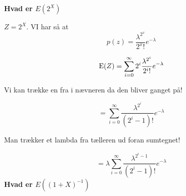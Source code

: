 \textbf{Hvad er $E \left( 2^X \right)$}

$Z = 2^X$. VI har så at
\begin{equation}
    p(z) = \frac{\lambda^{2^x}}{2^x!}e^{-\lambda}
\end{equation}

\begin{equation}
    \text{E}(Z) = \sum_{i=0}^\infty 2^{i} \frac{\lambda^{2^i}}{2^i!}e^{-\lambda}
\end{equation}

Vi kan trække en fra i nævneren da den bliver ganget på!

\begin{equation}
    = \sum_{i=0}^\infty \frac{\lambda^{2^i}}{(2^i - 1)!}e^{-\lambda}
\end{equation}

Man trækker et lambda fra tælleren ud foran sumtegnet!

\begin{equation}
    = \lambda \sum_{i=0}^\infty \frac{\lambda^{2^i - 1}}{(2^i - 1)!}e^{-\lambda}
\end{equation}
\textbf{Hvad er $E \left((1+X)^{-1} \right)$}

